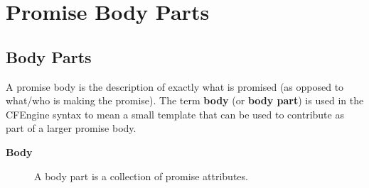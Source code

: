 



\chapter{Promise Body Parts}





\section{Body Parts}

A promise body is the description of exactly what is promised (as
opposed to what/who is making the promise). The term \textbf{body} (or
\textbf{body part}) is used in the CFEngine syntax to mean a small template
that can be used to contribute as part of a larger promise body.

\begin{description}
\item[\textbf{Body}] A body part is a collection of promise attributes.
\end{description}

